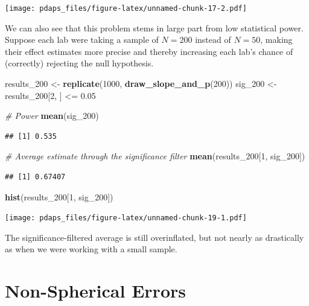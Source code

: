 \documentclass[12pt,oneside,openany]{book}
\newenvironment{Shaded}{\begin{snugshade}}{\end{snugshade}}
\newcommand{\KeywordTok}[1]{\textcolor[rgb]{0.13,0.29,0.53}{\textbf{{#1}}}}
\newcommand{\DecValTok}[1]{\textcolor[rgb]{0.00,0.00,0.81}{{#1}}}
\newcommand{\FloatTok}[1]{\textcolor[rgb]{0.00,0.00,0.81}{{#1}}}
\newcommand{\StringTok}[1]{\textcolor[rgb]{0.31,0.60,0.02}{{#1}}}
\newcommand{\CommentTok}[1]{\textcolor[rgb]{0.56,0.35,0.01}{\textit{{#1}}}}
\newcommand{\NormalTok}[1]{{#1}}
\begin{document}
\texttt{[image: pdaps\_files/figure-latex/unnamed-chunk-17-2.pdf]}

We can also see that this problem stems in large part from low
statistical power. Suppose each lab were taking a sample of \(N = 200\)
instead of \(N = 50\), making their effect estimates more precise and
thereby increasing each lab's chance of (correctly) rejecting the null
hypothesis.

\begin{Shaded}
\begin{Highlighting}[]
\NormalTok{results_200 <-}\StringTok{ }\KeywordTok{replicate}\NormalTok{(}\DecValTok{1000}\NormalTok{, }\KeywordTok{draw_slope_and_p}\NormalTok{(}\DecValTok{200}\NormalTok{))}
\NormalTok{sig_200 <-}\StringTok{ }\NormalTok{results_200[}\DecValTok{2}\NormalTok{, ] <=}\StringTok{ }\FloatTok{0.05}

\CommentTok{# Power}
\KeywordTok{mean}\NormalTok{(sig_200)}
\end{Highlighting}
\end{Shaded}

\begin{verbatim}
## [1] 0.535
\end{verbatim}

\begin{Shaded}
\begin{Highlighting}[]
\CommentTok{# Average estimate through the significance filter}
\KeywordTok{mean}\NormalTok{(results_200[}\DecValTok{1}\NormalTok{, sig_200])}
\end{Highlighting}
\end{Shaded}

\begin{verbatim}
## [1] 0.67407
\end{verbatim}

\begin{Shaded}
\begin{Highlighting}[]
\KeywordTok{hist}\NormalTok{(results_200[}\DecValTok{1}\NormalTok{, sig_200])}
\end{Highlighting}
\end{Shaded}

\texttt{[image: pdaps\_files/figure-latex/unnamed-chunk-19-1.pdf]}

The significance-filtered average is still overinflated, but not nearly
as drastically as when we were working with a small sample.

\chapter{Non-Spherical Errors}\label{nonspherical}
\end{document}
